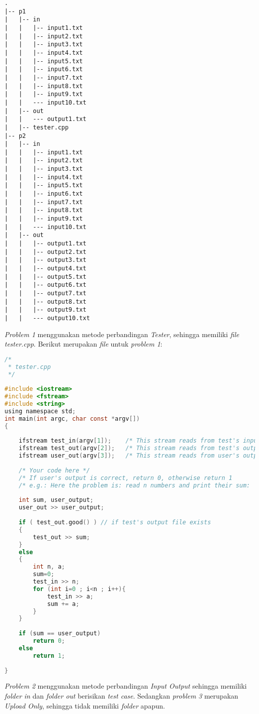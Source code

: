 \begin{enumerate}
\begin{lstlisting}
.
|-- p1
|   |-- in
|   |   |-- input1.txt
|   |   |-- input2.txt
|   |   |-- input3.txt
|   |   |-- input4.txt
|   |   |-- input5.txt
|   |   |-- input6.txt
|   |   |-- input7.txt
|   |   |-- input8.txt
|   |   |-- input9.txt
|   |   --- input10.txt
|   |-- out
|   |   --- output1.txt
|   |-- tester.cpp
|-- p2
|   |-- in
|   |   |-- input1.txt
|   |   |-- input2.txt
|   |   |-- input3.txt
|   |   |-- input4.txt
|   |   |-- input5.txt
|   |   |-- input6.txt
|   |   |-- input7.txt
|   |   |-- input8.txt
|   |   |-- input9.txt
|   |   --- input10.txt
|   |-- out
|   |   |-- output1.txt
|   |   |-- output2.txt
|   |   |-- output3.txt
|   |   |-- output4.txt
|   |   |-- output5.txt
|   |   |-- output6.txt
|   |   |-- output7.txt
|   |   |-- output8.txt
|   |   |-- output9.txt
|   |   --- output10.txt
\end{lstlisting}

\textit{Problem 1} menggunakan metode perbandingan \textit{Tester}, sehingga memiliki \textit{file tester.cpp}. Berikut merupakan \textit{file} untuk \textit{problem 1}:

\begin{lstlisting}[language=C,caption=Kode metode perbandingan \textit{tester} dengan bahasa \textit{tester.cpp}, label=kode:cppfileproblem1]
/*
 * tester.cpp
 */
 
#include <iostream>
#include <fstream>
#include <string>
using namespace std;
int main(int argc, char const *argv[])
{
 
	ifstream test_in(argv[1]);    /* This stream reads from test's input file   */
	ifstream test_out(argv[2]);   /* This stream reads from test's output file  */
	ifstream user_out(argv[3]);   /* This stream reads from user's output file  */
 
	/* Your code here */
	/* If user's output is correct, return 0, otherwise return 1       */
	/* e.g.: Here the problem is: read n numbers and print their sum:  */
 
	int sum, user_output;
	user_out >> user_output;
 
	if ( test_out.good() ) // if test's output file exists
	{
		test_out >> sum;
	}
	else
	{
		int n, a;
		sum=0;
		test_in >> n;
		for (int i=0 ; i<n ; i++){
			test_in >> a;
			sum += a;
		}
	}
 
	if (sum == user_output)
		return 0;
	else
		return 1;
 
}
\end{lstlisting}

\textit{Problem 2} menggunakan metode perbandingan \textit{Input Output} sehingga memiliki \textit{folder in} dan \textit{folder out} berisikan \textit{test case}. Sedangkan \textit{problem 3} merupakan \textit{Upload Only}, sehingga tidak memiliki \textit{folder} apapun.

\end{enumerate}

